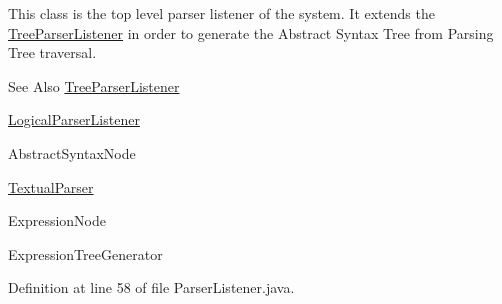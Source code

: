 This class is the top level parser listener of the system. It extends the \hyperlink{classit_1_1emarolab_1_1cagg_1_1core_1_1language_1_1parser_1_1ANTLRInterface_1_1TreeParserListener_a6fa6c6d0ef410c647cd37a9225b99076}{Tree\-Parser\-Listener} in order to generate the Abstract Syntax Tree from Parsing Tree traversal.\par
 

\begin{DoxySeeAlso}{See Also}
\hyperlink{classit_1_1emarolab_1_1cagg_1_1core_1_1language_1_1parser_1_1ANTLRInterface_1_1TreeParserListener_a6fa6c6d0ef410c647cd37a9225b99076}{Tree\-Parser\-Listener} 

\hyperlink{classit_1_1emarolab_1_1cagg_1_1core_1_1language_1_1parser_1_1ANTLRInterface_1_1LogicalParserListener_a04b67187eb5ceedb974bae64f44df62a}{Logical\-Parser\-Listener} 

Abstract\-Syntax\-Node 

\hyperlink{classit_1_1emarolab_1_1cagg_1_1core_1_1language_1_1parser_1_1TextualParser}{Textual\-Parser} 

Expression\-Node 

Expression\-Tree\-Generator 
\end{DoxySeeAlso}


Definition at line 58 of file Parser\-Listener.\-java.




